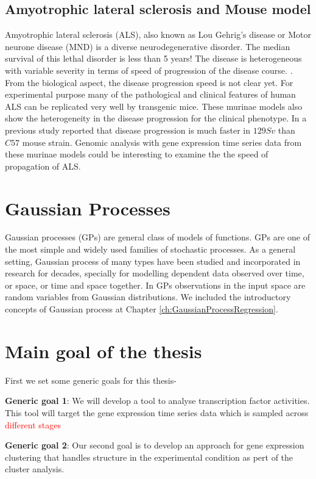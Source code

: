 \subsection{Amyotrophic lateral sclerosis and Mouse model}
Amyotrophic lateral sclerosis (ALS), also known as Lou Gehrig's disease or Motor neurone disease (MND) is a diverse neurodegenerative disorder. The median survival of this lethal disorder is less than 5 years! The disease is heterogeneous with variable severity in terms of speed of progression of the disease course. \cite{Brockington:2013, Peviani:2010}. From the biological aspect, the disease progression speed is not clear yet. For experimental purpose many of the pathological and clinical features of human ALS can be replicated very well by transgenic mice. These murinae models also show the heterogeneity in the disease progression for the clinical phenotype. In a previous study \cite{Pizzasegola:2009} reported that disease progression is much faster in $129Sv$ than $C57$ mouse strain. Genomic analysis with gene expression time series data from these murinae models could be interesting to examine the the speed of propagation of ALS.

\section{Gaussian Processes}
Gaussian processes (GPs) are general class of models of functions. GPs are one of the most simple and widely used families of stochastic processes. As a general setting, Gaussian process of many types have been studied and incorporated in research for decades, specially for modelling dependent data observed over time, or space, or time and space together. In GPs observations in the input space are random variables from Gaussian distributions. We included the introductory concepts of Gaussian process at Chapter \ref{ch:GaussianProcessRegression}.

\section{Main goal of the thesis}
First we set some generic goals for this thesis-

\textbf{Generic goal 1}: We will develop a tool to analyse transcription factor activities. This tool will target the gene expression time series data which is sampled across \textcolor{red} {different stages}

\textbf{Generic goal 2}: Our second goal is to develop an approach for gene expression clustering that handles structure in the experimental condition as pert of the cluster analysis.

